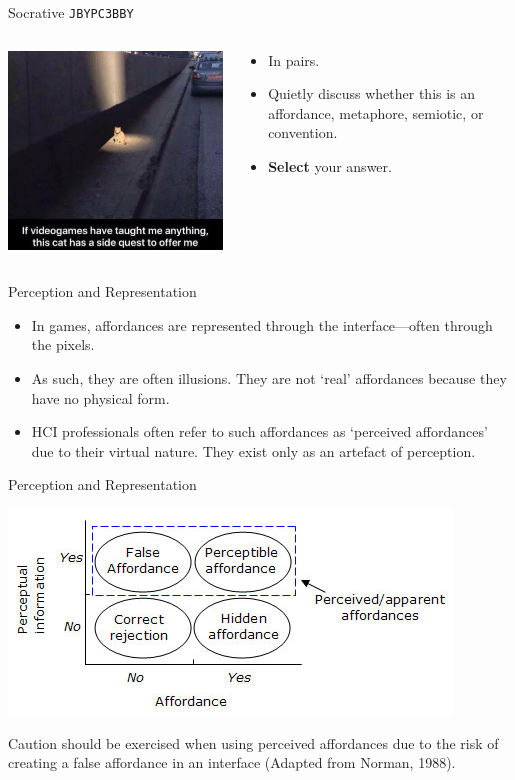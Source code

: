 \begin{frame}[fragile]{Socrative \texttt{JBYPC3BBY}}
	\begin{columns}[onlytextwidth]
		\begin{column}{0.45\textwidth}
			\includegraphics[height=24ex]{quest_cat.jpg}
		\end{column}
		\begin{column}{0.45\textwidth}
			\begin{itemize}
				\item In pairs.
				\item Quietly discuss whether this is an affordance, metaphore, semiotic, or convention.
				\item \textbf{Select} your answer.
			\end{itemize}
		\end{column}
	\end{columns}
\end{frame}

\begin{frame}{Perception and Representation}
	\begin{itemize}
		\item In games, affordances are represented through the interface---often through the pixels. 
		\item As such, they are often illusions. They are not `real' affordances because they have no physical form.
		\item HCI professionals often refer to such affordances as `perceived affordances' due to their virtual nature. They exist only as an artefact of perception.
	\end{itemize}
\end{frame}

\begin{frame}{Perception and Representation}
	\begin{centering}
		\includegraphics[height=20ex]{false_affordance.jpg}
	\end{centering}
	
	\vspace{2ex}
	
	Caution should be exercised when using perceived affordances due to the risk of creating a false affordance in an interface (Adapted from Norman, 1988).
\end{frame}

